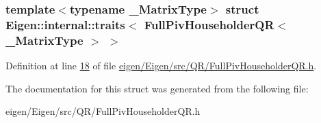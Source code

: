 \subsubsection*{template$<$typename \+\_\+\+Matrix\+Type$>$\newline
struct Eigen\+::internal\+::traits$<$ Full\+Piv\+Householder\+Q\+R$<$ \+\_\+\+Matrix\+Type $>$ $>$}



Definition at line \hyperlink{eigen_2_eigen_2src_2_q_r_2_full_piv_householder_q_r_8h_source_l00018}{18} of file \hyperlink{eigen_2_eigen_2src_2_q_r_2_full_piv_householder_q_r_8h_source}{eigen/\+Eigen/src/\+Q\+R/\+Full\+Piv\+Householder\+Q\+R.\+h}.



The documentation for this struct was generated from the following file\+:\begin{DoxyCompactItemize}
\item 
eigen/\+Eigen/src/\+Q\+R/\+Full\+Piv\+Householder\+Q\+R.\+h\end{DoxyCompactItemize}
